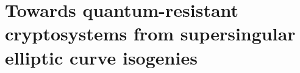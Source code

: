 





\newcommand{\dottriangle}[2][\i-\j]{  \foreach \i in {0,...,#2} {    \foreach \j in {0,...,\i} {      \draw(\i,\j) node{#1};    }  }}


\let\prop\proposition
\let\endprop\endproposition

\newcommand{\QQ}{{\mathbb{Q}}}
\newcommand{\ZZ}{{\mathbb{Z}}}
\newcommand{\RR}{{\mathbb{R}}}
\newcommand{\FF}{{\mathbb{F}}}
\newcommand{\VV}{{\mathcal{V}}}
\newcommand{\EE}{{\mathcal{E}}}
\newcommand{\iso}{\cong}
\newcommand{\id}{\operatorname{sID}}
\newcommand{\cyc}[1]{{\langle #1 \rangle}}
\def\abs#1{\left|#1\right|}



\chapter{Towards quantum-resistant cryptosystems from supersingular elliptic
curve isogenies}





